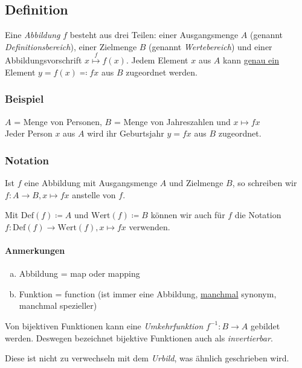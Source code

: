 \subsection{Definition}
Eine \emph{Abbildung} $f$ besteht aus drei Teilen: einer Ausgangsmenge $A$
(genannt \emph{Definitionsbereich}), einer Zielmenge $B$ (genannt
\emph{Wertebereich}) und einer Abbildungsvorschrift $x \overset{f}{\mapsto}
f(x)$. Jedem Element $x$ aus $A$ kann \underline{genau ein} Element $y = f(x)
\eqcolon fx$ aus $B$ zugeordnet werden.

\subsubsection{Beispiel}
$A$ = Menge von Personen, $B$ = Menge von Jahreszahlen und $x \mapsto
fx$\\
Jeder Person $x$ aus $A$ wird ihr Geburtsjahr $y = fx$ aus $B$ zugeordnet.

\subsubsection{Notation}
Ist $f$ eine Abbildung mit Ausgangsmenge $A$ und Zielmenge $B$, so schreiben
wir $f \colon A \rightarrow B, x \mapsto fx$ anstelle von $f$.

Mit $\text{Def}(f) \coloneq A$ und $\text{Wert}(f) \coloneq B$ können wir auch
für $f$ die Notation $f \colon \text{Def}(f) \rightarrow \text{Wert}(f), x
\mapsto fx$ verwenden.

\paragraph{Anmerkungen}
\begin{enumerate}[(a)]
  \item Abbildung = map oder mapping
  \item Funktion = function (ist immer eine Abbildung, \underline{manchmal}
  synonym, manchmal spezieller)
\end{enumerate}

Von bijektiven Funktionen kann eine \emph{Umkehrfunktion} $f^{-1} :
{B}\rightarrow{A} $ gebildet werden. Deswegen bezeichnet bijektive
Funktionen auch als \emph{invertierbar}.

Diese ist nicht zu verwechseln mit dem \emph{Urbild}, was ähnlich geschrieben
wird.

